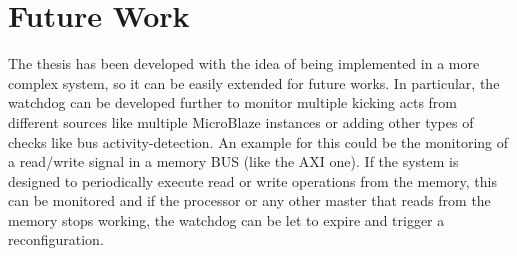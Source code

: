 








\section{Future Work}

The thesis has been developed with the idea of being implemented in a more complex system, so it can be easily extended for future works. In particular, the watchdog can be developed further to monitor multiple kicking acts from different sources like multiple MicroBlaze instances or adding other types of checks like bus activity-detection. An example for this could be the monitoring of a read/write signal in a memory BUS (like the AXI one). If the system is designed to periodically execute read or write operations from the memory, this can be monitored and if the processor or any other master that reads from the memory stops working, the watchdog can be let to expire and trigger a reconfiguration. \bigskip

